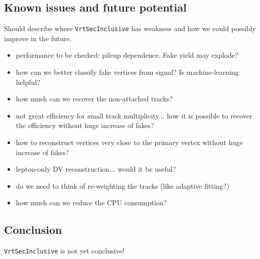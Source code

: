 \subsection{Known issues and future potential}
Should describe where {\tt VrtSecInclusive} has weakness and how we could possibly improve in the future.
\begin{itemize}
\item performance to be checked: pileup dependence. Fake yield may explode?
\item how can we better classify fake vertices from signal? Is machine-learning helpful?
\item how much can we recover the non-attached tracks?
\item not great efficiency for small track multiplicity... how it is possible to recover the efficiency without huge increase of fakes?
\item how to reconstruct vertices very close to the primary vertex without huge increase of fakes?
\item lepton-only DV reconstruction... would it be useful?
\item do we need to think of re-weighting the tracks (like adaptive fitting?)
\item how much can we reduce the CPU consumption?
\end{itemize}


\subsection{Conclusion}
\label{sec:conclusion}
{\tt VrtSecInclusive} is not yet conclusive!

\printbibliography
%
%



